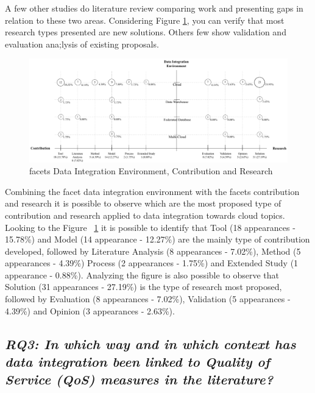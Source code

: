 A few other studies do literature review comparing work and presenting
gaps in relation to these two areas. Considering Figure \ref{fig:facet2}, you
can verify that most research types presented are new solutions. Others few show validation
and evaluation ana;lysis of existing proposals.     

\begin{figure}[h]
\centering
\includegraphics[scale=0.48]{figs/bubble-charts/DI-Environment-Contribution-Research.pdf}
\caption{facets Data Integration Environment, Contribution and Research}\label{fig:facet2}
\end{figure}

Combining the facet data integration environment with the facets contribution
and research it is possible to observe which are the most proposed type of
contribution and research applied to data integration towards cloud topics. 
Looking to the Figure ~\ref{fig:facet2} it is possible to identify that Tool (18
appearances - 15.78\%) and Model (14 appearance - 12.27\%) are the mainly type
of contribution developed, followed by Literature Analysis (8 appearances -
7.02\%), Method (5 appearances - 4.39\%) Process (2 appearances - 1.75\%) and
Extended Study (1 appearance - 0.88\%).
Analyzing the figure is also possible to observe that Solution (31 appearances -
27.19\%) is the type of research most proposed, followed by Evaluation (8
appearances - 7.02\%), Validation (5 appearances - 4.39\%) and Opinion (3
appearances - 2.63\%).
 
\subsection{\textit{RQ3:  In which way and in which context has data integration been linked to Quality of Service (QoS) measures in the literature?}}

